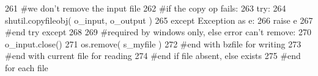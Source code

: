 \begin{DoxyCode}
261                         \textcolor{comment}{#we don't remove the input file}
262                         \textcolor{comment}{#if the copy op fails:}
263                         \textcolor{keywordflow}{try}: 
264                             shutil.copyfileobj( o\_input, o\_output )
265                         \textcolor{keywordflow}{except} Exception \textcolor{keyword}{as}  e:
266                             \textcolor{keywordflow}{raise} e
267                         \textcolor{comment}{#end try except}
268 
269                         \textcolor{comment}{#required by windows only, else error can't remove:}
270                         o\_input.close()
271                         os.remove( s\_myfile )   
272                     \textcolor{comment}{#end with bzfile for writing}
273                 \textcolor{comment}{#end with current file for reading}
274             \textcolor{comment}{#end if file absent, else exists}
275         \textcolor{comment}{#end for each file}
\end{DoxyCode}
